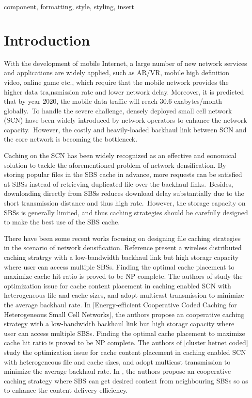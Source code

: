 \documentclass[conference]{IEEEtran}
\begin{document}
\begin{IEEEkeywords}
component, formatting, style, styling, insert
\end{IEEEkeywords}

\section{Introduction}
With the development of mobile Internet, a large number of new network services and applications are widely applied, such as AR/VR, mobile high definition video, online game etc., which require that the mobile network provides the higher data tra,nsmission rate and lower network delay. Moreover, it is predicted that by year 2020, the mobile data traffic will reach 30.6 exabytes/month globally\cite{cisco}. To handle the severe challenge, densely deployed small cell network (SCN) have been widely introduced by network operators to enhance the network capacity. However, the costly and heavily-loaded backhaul link between SCN and the core network is becoming the bottleneck. 

Caching on the SCN has been widely recognized as an effective and eonomical solution to tackle the aforementioned problem of network densification. By storing popular files in the SBS cache in advance\cite{6600983,6933434}, more requests can be satisfied at SBSs instead of retrieving duplicated file over the backhaul links. Besides, downloading directly from SBSs reduces download delay substantially due to the short transmission distance and thus high rate. However, the storage capacity on SBSs is generally limited, and thus caching strategies should be carefully designed to make the best use of the SBS cache.

There have been some recent works focusing on designing file caching strategies in the scenario of network densification. Reference \cite{6600983} present a wireless distributed caching stratrgy with a low-bandwidth backhaul link but high storagr capacity where user can access multiple SBSs. Finding the optimal cache placement to maximize cache hit ratio is proved to be NP complete. The authors of \cite{6600983} study the optimization issue for cache content placement in caching enabled SCN with heterogeneous file and cache sizes, and adopt multicast transmission to minimize the average backhaul rate. In [Energy-efficient Cooperative Coded Caching for Heterogeneous Small Cell Networks], the authors propose an cooperative caching strategy with a low-bandwidth backhaul link but high storagr capacity where user can access multiple SBSs. Finding the optimal cache placement to maximize cache hit ratio is proved to be NP complete. The authors of [cluster hetnet coded] study the optimization issue for cache content placement in caching enabled SCN with heterogeneous file and cache sizes, and adopt multicast transmission to minimize the average backhaul rate. In \cite{8116421}, the authors propose an cooperative caching strategy where SBS can get desired content from neighbouring SBSs so as to enhance the content delivery efficiency.
\end{document}

